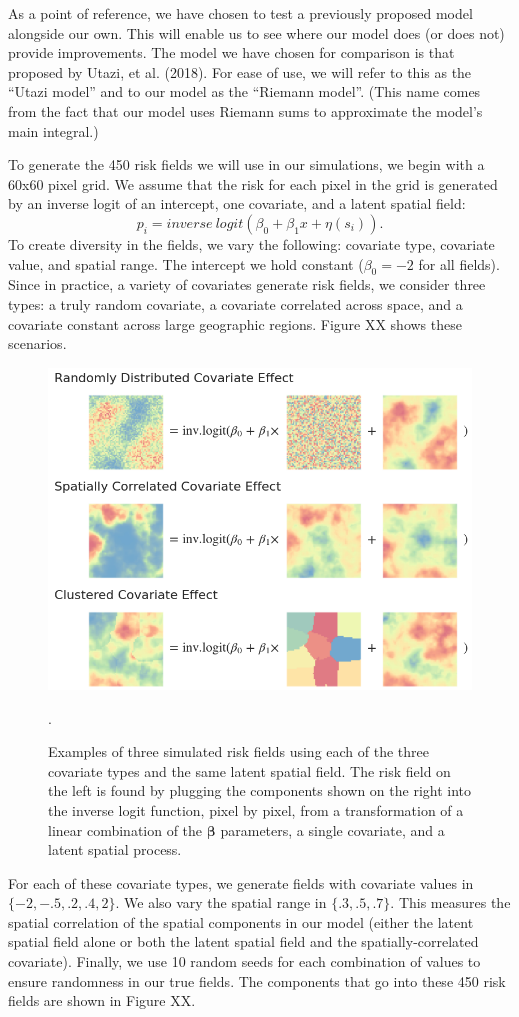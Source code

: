 \documentclass{article}
\begin{document}
As a point of reference, we have chosen to test a previously proposed model alongside our own. This will enable us to see where our model does (or does not) provide improvements. The model we have chosen for comparison is that proposed by Utazi, et al. (2018). For ease of use, we will refer to this as the ``Utazi model'' and to our model as the ``Riemann model''. (This name comes from the fact that our model uses Riemann sums to approximate the model's main integral.)

To generate the 450 risk fields we will use in our simulations, we begin with a 60x60 pixel grid. We assume that the risk for each pixel in the grid is generated by an inverse logit of an intercept, one covariate, and a latent spatial field: $$p_i=inverse\ logit(\beta_0+\beta_1x+ \eta(s_i)).$$ To create diversity in the fields, we vary the following: covariate type, covariate value, and spatial range. The intercept we hold constant ($\beta_0=-2$ for all fields). Since in practice, a variety of covariates generate risk fields, we consider three types: a truly random covariate, a covariate correlated across space, and a covariate constant across large geographic regions. Figure XX shows these scenarios.
\begin{figure}[ht]
    \centering
    \includegraphics[width=.8\textwidth]{./figures/covariateeffects.png}
    \caption{Examples of three simulated risk fields using each of the three covariate types and the same latent spatial field. The risk field on the left is found by plugging the components shown on the right into the inverse logit function, pixel by pixel, from a transformation of a linear combination of the $\boldsymbol{\beta}$ parameters, a single covariate, and a latent spatial process.}.
\end{figure} For each of these covariate types, we generate fields with covariate values in $\{-2, -.5, .2, .4, 2\}$. We also vary the spatial range in $\{.3, .5, .7\}$. This measures the spatial correlation of the spatial components in our model (either the latent spatial field alone or both the latent spatial field and the spatially-correlated  covariate). Finally, we use 10 random seeds for each combination of values to ensure randomness in our true fields. The components that go into these 450 risk fields are shown in Figure XX.
\end{document}
